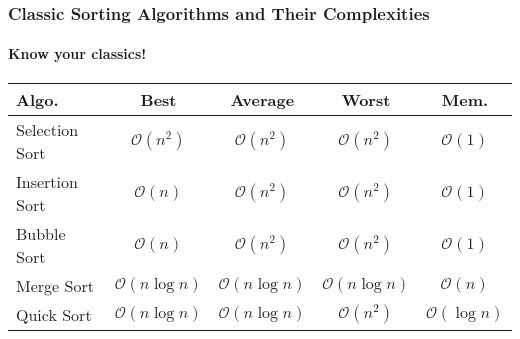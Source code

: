 \documentclass[compress,12pt,bookmark]{beamer}
\begin{document}
\begin{frame}
    \frametitle{Classic Sorting Algorithms and Their Complexities}
    \framesubtitle{Know your classics!}
    \begin{table}
        \begin{tabular}{lcccc}
            \toprule
            Algo. & Best & Average & Worst & Mem. \\
            \midrule
            Selection Sort & $\mathcal{O}(n^2)$ & $\mathcal{O}(n^2)$ & $\mathcal{O}(n^2)$ & $\mathcal{O}(1)$ \\
            Insertion Sort & $\mathcal{O}(n)$ & $\mathcal{O}(n^2)$ & $\mathcal{O}(n^2)$ & $\mathcal{O}(1)$ \\
            Bubble Sort & $\mathcal{O}(n)$ & $\mathcal{O}(n^2)$ & $\mathcal{O}(n^2)$ & $\mathcal{O}(1)$ \\
            Merge Sort & $\mathcal{O}(n \log n)$ & $\mathcal{O}(n \log n)$ & $\mathcal{O}(n \log n)$ & $\mathcal{O}(n)$ \\
            Quick Sort & $\mathcal{O}(n \log n)$ & $\mathcal{O}(n \log n)$ & $\mathcal{O}(n^2)$ & $\mathcal{O}(\log n)$ \\
            \bottomrule
        \end{tabular}
    \end{table}
\end{frame}
\end{document}
